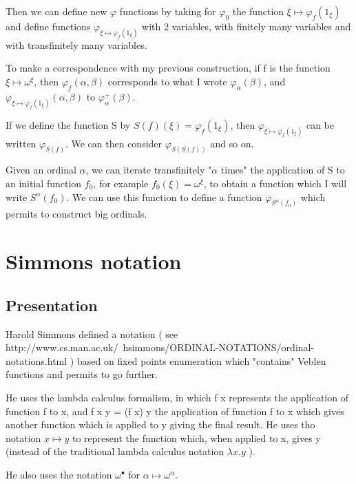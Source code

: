 \documentclass[10pt]{article}
\begin{document}
Then we can define new \( \varphi \) functions by taking for \( \varphi_0 \) the function \( \xi \mapsto \varphi_f(1_\xi) \) and define functions \( \varphi_{\xi \mapsto \varphi_f(1_\xi)} \) with 2 variables, with finitely many variables and with transfinitely many variables.

To make a correspondence with my previous construction, if f is the function \( \xi \mapsto \omega^\xi \), then \( \varphi_f(\alpha,\beta) \) corresponds to what I wrote \( \varphi_\alpha(\beta) \), and \( \varphi_{\xi \mapsto \varphi_f(1_\xi)}(\alpha,\beta) \) to \( \varphi^+_\alpha(\beta) \). 

If we define the function S by \( S(f)(\xi) = \varphi_f(1_\xi) \), then \( \varphi_{\xi \mapsto \varphi_f(1_\xi)}\) can be written \( \varphi_{S(f)} \). We can then consider \( \varphi_{S(S(f))} \) and so on.

Given an ordinal \( \alpha \), we can iterate transfinitely "\( \alpha \) times" the application of S to an initial function \( f_0 \), for example \( f_0(\xi) = \omega^\xi \), to obtain a function which I will write \( S^\alpha(f_0) \). We can use this function to define a function \( \varphi_{S^\alpha(f_0)} \) which permits to construct big ordinals.




\section{Simmons notation}

\subsection{Presentation}

Harold Simmons defined a notation ( see http://www.cs.man.ac.uk/~hsimmons/ORDINAL-NOTATIONS/ordinal-notations.html ) based on fixed points enumeration which "contains" Veblen functions and permits to go further. 

He uses the lambda calculus formalism, in which f x represents the application of function f to x, and f x y = (f x) y the application of function f to x which gives another function which is applied to y giving the final result. 
He uses tho notation \( x \mapsto y \) to represent the function which, when applied to x, gives y (instead of the traditional lambda calculus notation \( \lambda x . y \) ).

He also uses the notation \( \omega^\bullet \) for \( \alpha \mapsto \omega^\alpha \).
\end{document}
